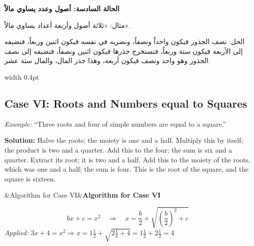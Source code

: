 \documentclass[11pt,a4paper,openany,oneside]{book}
\newenvironment{mathbox}[1][]{%
  \smallskip\par\noindent
  \begin{lrbox}{\mathboxsave}
  \begin{minipage}{\dimexpr\linewidth-2\fboxsep-2\fboxrule\relax}%
  \setlength{\parskip}{0.3em}%
  \ifx&#1&\else\textbf{#1}\\[0.2cm]\fi
}{%
  \end{minipage}%
  \end{lrbox}
  \fcolorbox{sectioncolor}{mathbg}{\usebox{\mathboxsave}}%
  \smallskip}
\begin{document}
\newpage

\noindent\begin{minipage}[t]{0.48\textwidth}
\raggedleft

\begin{Arabic}
\textbf{الحالة السادسة: أصول وعدد يساوي مالاً}

مثال: «ثلاثة أصول وأربعة أعداد يساوي مالاً».

الحل: نصف الجذور فيكون واحداً ونصفاً، ونضربه في نفسه فيكون اثنين وربعاً، فنضيفه إلى الأربعة فيكون ستة وربعاً، فنستخرج جذرها فيكون اثنين ونصفاً، فنضيفه إلى نصف الجذور وهو واحد ونصف فيكون أربعة، وهذا جذر المال، والمال ستة عشر.
\end{Arabic}

\end{minipage}%
\hfill\vrule width 0.4pt\hfill
\begin{minipage}[t]{0.48\textwidth}
\raggedright

\subsection*{Case VI: Roots and Numbers equal to Squares}

\textit{Example:} ``Three roots and four of simple numbers are equal to a square.''

\textbf{Solution:} Halve the roots; the moiety is one and a half. Multiply this by itself; the product is two and a quarter. Add this to the four; the sum is six and a quarter. Extract its root; it is two and a half. Add this to the moiety of the roots, which was one and a half; the sum is four. This is the root of the square, and the square is sixteen.

\begin{mathbox}[Algorithm for Case VI]
\begin{equation}
bx + c = x^2 \quad\Longrightarrow\quad x = \frac{b}{2} + \sqrt{\left(\frac{b}{2}\right)^2 + c}
\end{equation}
\textit{Applied:} $3x + 4 = x^2 \Rightarrow x = 1\tfrac{1}{2} + \sqrt{2\tfrac{1}{4} + 4} = 1\tfrac{1}{2} + 2\tfrac{1}{2} = 4$
\end{mathbox}

\end{minipage}
\vspace{0.3cm}

\newpage

\end{document}
